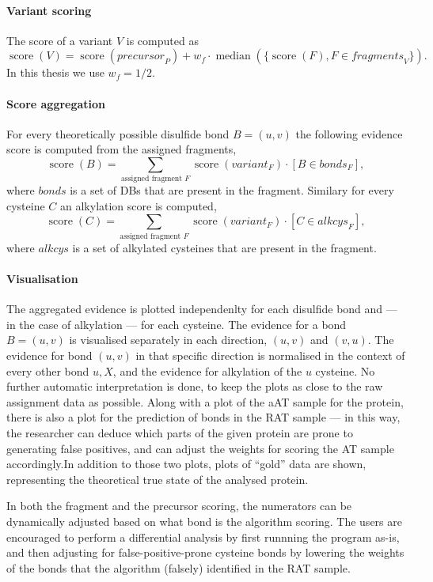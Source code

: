 \paragraph{Variant scoring} The score of a variant \(V\) is computed as \[\operatorname{score}(V) = \operatorname{score}(\mathit{precursor}_P) + w_f \cdot \operatorname{median}(\{ \operatorname{score}(F), F \in \mathit{fragments}_V \}).\] In this thesis we use \(w_f = 1/2\).

\paragraph{Score aggregation} For every theoretically possible disulfide bond \(B = (u, v)\) the following evidence score is computed  from the assigned fragments, \[\operatorname{score}(B) = \sum_{\text{assigned fragment } F} \operatorname{score}(\mathit{variant}_F) \cdot [B \in \mathit{bonds}_F], \] where \(\mathit{bonds}\) is a set of DBs that are present in the fragment. Similary for every cysteine \(C\) an alkylation score is computed, \[\operatorname{score}(C) = \sum_{\text{assigned fragment } F} \operatorname{score}(\mathit{variant}_F) \cdot [C \in \mathit{alkcys}_F],\] where \(\mathit{alkcys}\) is a set of alkylated cysteines that are present in the fragment.


\paragraph{Visualisation} The aggregated evidence is plotted independenlty for each disulfide bond and --- in the case of alkylation --- for each cysteine. The evidence for a bond \(B = (u, v)\) is visualised separately in each direction, \((u, v)\) and \((v, u)\). The evidence for bond \((u, v)\) in that specific direction is normalised in the context of every other bond \(u, X\), and the evidence for alkylation of the \(u\) cysteine. No further automatic interpretation is done, to keep the plots as close to the raw assignment data as possible. Along with a plot of the aAT sample for the protein, there is also a plot for the prediction of bonds in the RAT sample --- in this way, the researcher can deduce which parts of the given protein are prone to generating false positives, and can adjust the weights for scoring the AT sample accordingly.In addition to those two plots, plots of ``gold'' data are shown, representing the theoretical true state of the analysed protein.

In both the fragment and the precursor scoring, the numerators can be dynamically adjusted based on what bond is the algorithm scoring. The users are encouraged to perform a differential analysis by first runnning the program as-is, and then adjusting for false-positive-prone cysteine bonds by lowering the weights of the bonds that the algorithm (falsely) identified in the RAT sample.
